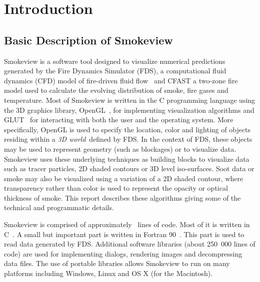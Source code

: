\documentclass[11pt,twoside]{book}
\begin{document}

\cleardoublepage
\tableofcontents

\cleardoublepage
\listoffigures

\mainmatter


%
%

\chapter{Introduction}
\section{Basic Description of Smokeview}
Smokeview is a software tool designed to visualize numerical
predictions generated by the Fire Dynamics Simulator (FDS), a
computational fluid dynamics (CFD) model of fire-driven fluid
flow~\cite{FDS_Tech_Guide,FDS_Users_Guide} and CFAST a two-zone
fire model\cite{CFAST_Tech_Guide_6} used to calculate the evolving
distribution of smoke, fire gases and temperature. Most of
Smokeview is written in the C programming language using the 3D
graphics library, OpenGL~\cite{OpenGLRed}, for implementing
visualization algorithms and GLUT~\cite{OpenGLGlut} for
interacting with both the user and the operating system. More
specifically, OpenGL is used to specify the location, color and
lighting of objects residing within a {\em 3D world}\ defined by
FDS. In the context of FDS, these objects may be used to represent
geometry (such as blockages) or to visualize data. Smokeview uses
these underlying techniques as building blocks to visualize data
such as tracer particles, 2D shaded contours or 3D level
iso-surfaces.  Soot data or smoke may also be visualized using a
variation of a 2D shaded contour, where transparency rather than
color is used to represent the opacity or optical thickness of
smoke. This report describes these algorithms giving some of the
technical and programmatic details.

Smokeview is comprised of approximately \smvlines\ lines of code.
Most of it is written in C~\cite{C:book}. A small but important
part is written in Fortran 90~\cite{Fortran:book}.  This part is
used to read data generated by FDS.  Additional software libraries
(about 250~000 lines of code) are used for implementing dialogs,
rendering images and decompressing data files. The use of portable
libraries allows Smokeview to run on many platforms including
Windows, Linux and OS X (for the Macintosh).
\end{document}
